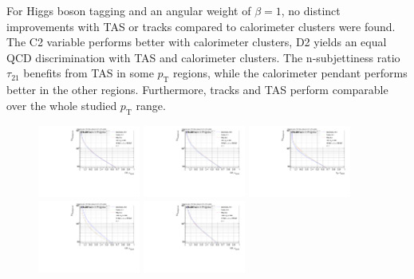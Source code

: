 For Higgs boson tagging and an angular weight of $\beta=1$, no distinct improvements with TAS or tracks compared to calorimeter clusters were found. The C2 variable performs better with calorimeter clusters, D2 yields an equal QCD discrimination with TAS and calorimeter clusters. The n-subjettiness ratio $\tau_{21}$ benefits from TAS in some $p_{\mathrm{T}}$ regions, while the calorimeter pendant performs better in the other regions. Furthermore, tracks and TAS perform comparable over the whole studied $p_{\mathrm{T}}$ range. 
\begin{figure}[htp]
\includegraphics[width=0.3\textwidth]{sascha_input/plots/Higgs/ROC/Beta1/ROC_ALL_h_recoJet_C2_bin2.pdf} 
\includegraphics[width=0.3\textwidth]{sascha_input/plots/Higgs/ROC/Beta1/ROC_ALL_h_recoJet_D2_bin2.pdf} 
\includegraphics[width=0.3\textwidth]{sascha_input/plots/Higgs/ROC/Beta1/ROC_ALL_h_recoJet_nSub21_bin2.pdf}
\bigskip
\includegraphics[width=0.3\textwidth]{sascha_input/plots/Higgs/ROC/Beta1/ROC_ALL_h_recoJet_C2_bin5.pdf} \hspace{6mm}
\includegraphics[width=0.3\textwidth]{sascha_input/plots/Higgs/ROC/Beta1/ROC_ALL_h_recoJet_D2_bin5.pdf} \hspace{6mm}

\end{figure}
